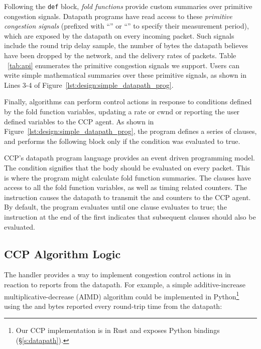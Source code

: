 Following the \texttt{def} block, \textit{fold functions} provide custom summaries over primitive congestion signals.
Datapath programs have read access to these \textit{primitive congestion signals} (prefixed with ``'' or ``'' to specify their measurement period), which are exposed by the datapath on every incoming packet. Such signals include the round trip delay sample, the number of bytes the datapath believes have been dropped by the network, and the delivery rates of packets. Table ~\ref{tab:api} enumerates the primitive congestion signals we support.
Users can write simple mathematical summaries over these primitive signals, as shown in Lines 3-4 of Figure~\ref{lst:design:simple_datapath_prog}.

Finally, algorithms can perform control actions in response to conditions defined by the fold function variables, \eg updating a rate or cwnd or reporting the user defined variables to the CCP agent.
As shown in Figure~\ref{lst:design:simple_datapath_prog}, the program defines a series of  clauses, and performs the following block only if the condition was evaluated to true.

CCP's datapath program language provides an event driven programming model.
The condition  signifies that the body should be evaluated on every packet.
This is where the program might calculate fold function summaries.
The  clauses have access to all the fold function variables, as well as timing related counters.
The  instruction causes the datapath to transmit the  and  counters to the CCP agent.
By default, the program evaluates until one  clause evaluates to true; the  instruction at the end of the first  indicates that subsequent  clauses should also be evaluated.

\subsection{CCP Algorithm Logic}
\label{s:ccp:ccp_algorithm_logic}
The  handler provides a way to
implement congestion control actions in \userspace in reaction to reports from the datapath.
For example, a simple additive-increase
multiplicative-decrease (AIMD) algorithm could be implemented in Python\footnote{Our CCP implementation is in Rust and exposes Python bindings (\S\ref{s:datapath}).} using
the  and  bytes reported every round-trip time from the datapath:

